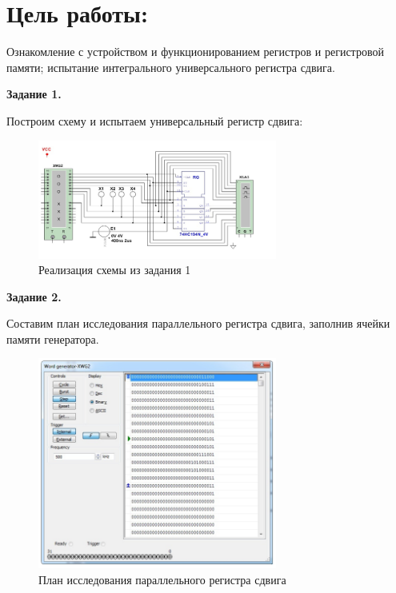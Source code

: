 \documentclass[spec, och, labwork]{shiza}
\begin{document}
\section{Цель работы:}

  Ознакомление с устройством и функционированием регистров и регистровой памяти; испытание интегрального универсального регистра сдвига.

  \textbf{Задание 1.}

  Построим схему и испытаем универсальный регистр сдвига:

  \begin{figure}[H]
    \centering     
    \includegraphics[width=0.7\textwidth]{photo/1}
    \caption{Реализация схемы из задания 1}
  \end{figure}

  \textbf{Задание 2.}

  Составим план исследования параллельного регистра сдвига, заполнив ячейки памяти генератора.

  \begin{figure}[H]
    \centering     
    \includegraphics[width=0.7\textwidth]{photo/2}
    \caption{План исследования параллельного регистра сдвига}
  \end{figure}
\end{document}
